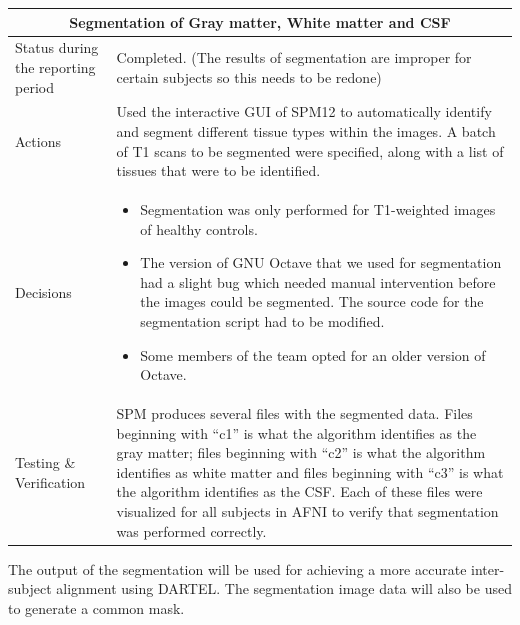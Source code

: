 \documentclass[12pt]{article}
\begin{document}
\begin{table}[H]
  \centering
  \begin{tabular} {| m{3.3cm} | m{11.5cm} | }
    \hline
    \multicolumn{2}{|c|}{Segmentation of Gray matter, White matter and
    CSF} \\ \hline
    Status during the reporting period   & Completed. (The results of
    segmentation are improper for certain subjects so this needs to be
    redone)   \\ \hline
    Actions &
    Used the interactive GUI of SPM12 to automatically identify and
    segment different tissue types within the images. A batch of
    T1 scans to be segmented were specified, along with a list of
    tissues that were to be identified.  \\ \hline

    Decisions &
    \begin{itemize}

      \item Segmentation was only performed for T1-weighted images of
        healthy controls.

      \item The version of GNU Octave that we used for segmentation
        had a slight bug which needed manual intervention before the
        images could be segmented. The source code for the
        segmentation script had to be modified.

      \item Some members of the team opted for an older version of
        Octave.

    \end{itemize} \\ \hline

    Testing \& Verification &
    SPM produces several files with the segmented data. Files
    beginning with ``c1'' is what the algorithm identifies as the gray
    matter; files beginning with ``c2'' is what the algorithm
    identifies as white matter and files beginning with ``c3'' is what
    the algorithm identifies as the CSF. Each of these files were
    visualized for all subjects in AFNI to verify that segmentation
    was performed correctly. \\ \hline

  \end{tabular}
\end{table}

The output of the segmentation will be used for achieving a more
accurate inter-subject alignment using DARTEL. The segmentation image
data will also be used to generate a common mask.
\end{document}
